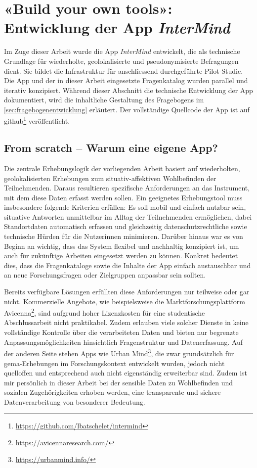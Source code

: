 \section{«Build your own tools»: Entwicklung der App \textit{InterMind}}
\label{sec:entwicklung_app}

Im Zuge dieser Arbeit wurde die App \textit{InterMind} entwickelt, die als technische Grundlage für wiederholte, geolokalisierte und pseudonymisierte Befragungen dient. Sie bildet die Infrastruktur für anschliessend durchgeführte Pilot-Studie. Die App und der in dieser Arbeit eingesetzte Fragenkatalog wurden parallel und iterativ konzipiert. Während dieser Abschnitt die technische Entwicklung der App dokumentiert, wird die inhaltliche Gestaltung des Fragebogens im \cref{sec:fragebogenentwicklung} erläutert. Der vollständige Quellcode der App ist auf \gls{github}\footnote{\href{https://github.com/lbatschelet/intermind}{https://github.com/lbatschelet/intermind}} veröffentlicht.


\subsection{From scratch – Warum eine eigene App?}

Die zentrale Erhebungslogik der vorliegenden Arbeit basiert auf wiederholten, geolokalisierten Erhebungen zum situativ-affektiven Wohlbefinden der Teilnehmenden. Daraus resultieren spezifische Anforderungen an das Instrument, mit dem diese Daten erfasst werden sollen. Ein geeignetes Erhebungstool muss insbesondere folgende Kriterien erfüllen: Es soll mobil und einfach nutzbar sein, situative Antworten unmittelbar im Alltag der Teilnehmenden ermöglichen, dabei Standortdaten automatisch erfassen und gleichzeitig datenschutzrechtliche sowie technische Hürden für die Nutzer\genderstern innen minimieren. Darüber hinaus war es von Beginn an wichtig, dass das System flexibel und nachhaltig konzipiert ist, um auch für zukünftige Arbeiten eingesetzt werden zu können. Konkret bedeutet dies, dass die Fragenkataloge sowie die Inhalte der App einfach austauschbar und an neue Forschungsfragen oder Zielgruppen anpassbar sein sollten.

Bereits verfügbare Lösungen erfüllten diese Anforderungen nur teilweise oder gar nicht. Kommerzielle Angebote, wie beispielsweise die Marktforschungsplattform Avicenna\footnote{\href{https://avicennaresearch.com/}{https://avicennaresearch.com/}}, sind aufgrund hoher Lizenzkosten für eine studentische Abschlussarbeit nicht praktikabel. Zudem erlauben viele solcher Dienste in keine vollständige Kontrolle über die verarbeiteten Daten und bieten nur begrenzte Anpassungsmöglichkeiten hinsichtlich Fragenstruktur und Datenerfassung. Auf der anderen Seite stehen Apps wie Urban Mind\footnote{\href{https://urbanmind.info/}{https://urbanmind.info/}}, die zwar grundsätzlich für \gls{gema}-Erhebungen im Forschungskontext entwickelt wurden, jedoch nicht quelloffen und entsprechend auch nicht eigenständig erweiterbar sind. Zudem ist mir persönlich in dieser Arbeit bei der sensible Daten zu Wohlbefinden und sozialen Zugehörigkeiten erhoben werden, eine transparente und sichere Datenverarbeitung von besonderer Bedeutung.

